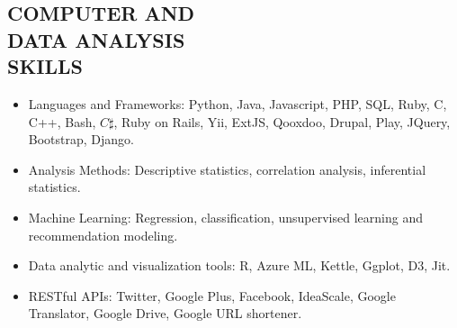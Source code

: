 \documentclass[line,margin]{res}
\begin{document}
\begin{resume}
\section{COMPUTER AND \\ DATA ANALYSIS \\ SKILLS} 
\begin{itemize} \itemsep -2pt      
\item Languages and Frameworks: Python, Java, Javascript, PHP, SQL, Ruby, C, C++, Bash, $C\sharp$, Ruby on Rails, Yii, ExtJS, Qooxdoo, Drupal, Play, JQuery, Bootstrap, Django.
\item Analysis Methods: Descriptive statistics, correlation analysis, inferential statistics.
\item Machine Learning: Regression, classification, unsupervised learning and recommendation modeling.
\item Data analytic and visualization tools: R, Azure ML, Kettle, Ggplot, D3, Jit. 
\item RESTful APIs: Twitter, Google Plus, Facebook, IdeaScale, Google Translator, Google Drive, Google URL shortener.
\end{itemize}



\end{resume}
\end{document}

